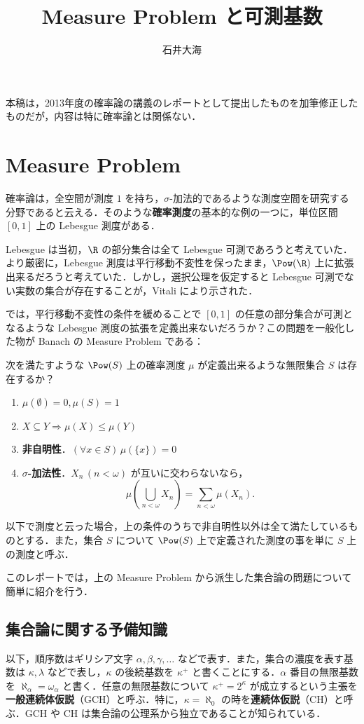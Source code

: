 \documentclass[a4j,uplatex]{jsarticle}
\title{Measure Problem と可測基数}
\author{石井大海}
\begin{document}
\maketitle

本稿は，2013年度の確率論の講義のレポートとして提出したものを加筆修正したものだが，内容は特に確率論とは関係ない．

\section{Measure Problem}
確率論は，全空間が測度 $1$ を持ち，$\sigma$-加法的であるような測度空間を研究する分野であると云える．そのような{\bfseries 確率測度}の基本的な例の一つに，単位区間 $[0, 1]$ 上の Lebesgue 測度がある．

Lebesgue は当初，$\R$ の部分集合は全て Lebesgue 可測であろうと考えていた．より厳密に，Lebesgue 測度は平行移動不変性を保ったまま，$\Pow(\R)$ 上に拡張出来るだろうと考えていた．しかし，選択公理を仮定すると Lebesgue 可測でない実数の集合が存在することが，Vitali により示された．

では，平行移動不変性の条件を緩めることで $[0, 1]$ の任意の部分集合が可測となるような Lebesgue 測度の拡張を定義出来ないだろうか？この問題を一般化した物が Banach の Measure Problem である：

\begin{problem}
 次を満たすような $\Pow(S)$ 上の確率測度 $\mu$ が定義出来るような無限集合 $S$ は存在するか？
 \begin{enumerate}[label=(\roman*)]
  \item $\mu(\emptyset) = 0, \mu(S) = 1$
  \item $X \subseteq Y \Rightarrow \mu(X) \leq \mu(Y)$
  \item {\bfseries 非自明性}．$(\forall x \in S)\, \mu(\{x\}) = 0$
  \item {\bfseries $\sigma$-加法性}．$X_n \, (n < \omega)$ が互いに交わらないなら，
	\[
	 \mu\left(\bigcup_{n < \omega} X_n\right) = \sum_{n < \omega} \mu(X_n).
	\]
 \end{enumerate}
\end{problem}

以下で測度と云った場合，上の条件のうちで非自明性以外は全て満たしているものとする．また，集合 $S$ について $\Pow(S)$ 上で定義された測度の事を単に $S$ 上の測度と呼ぶ．

このレポートでは，上の Measure Problem から派生した集合論の問題について簡単に紹介を行う．

\subsection{集合論に関する予備知識}
以下，順序数はギリシア文字 $\alpha, \beta, \gamma, \dots$ などで表す．また，集合の濃度を表す基数は $\kappa, \lambda$ などで表し，$\kappa$ の後続基数を $\kappa^+$ と書くことにする．$\alpha$ 番目の無限基数を $\aleph_\alpha = \omega_\alpha$ と書く．任意の無限基数について $\kappa^+ = 2^\kappa$ が成立するという主張を{\bfseries 一般連続体仮説}（GCH）と呼ぶ．特に，$\kappa = \aleph_0$ の時を{\bfseries 連続体仮説}（CH）と呼ぶ．GCH や CH は集合論の公理系から独立であることが知られている．
\end{document}
